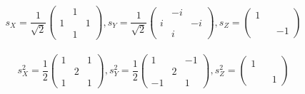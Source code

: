    \begin{displaymath}
     s_X=\frac{1}{\sqrt{2}}
     \left( \begin{array}{rrr}
       &1&\\
       1&&1\\
       &1&
     \end{array} \right), 
     s_Y=\frac{1}{\sqrt{2}}
     \left( \begin{array}{rrr}
       &-i&\\
       i&&-i\\
       &i&
     \end{array} \right), 
     s_Z=
     \left( \begin{array}{rrr}
       1&&\\
       &&\\
       &&-1
     \end{array} \right)
   \end{displaymath}
     \\
   \begin{displaymath}
     s_X^2=\frac{1}{2}
     \left( \begin{array}{rrr}
       1&&1\\
       &2&\\
       1&&1
     \end{array} \right), 
     s_Y^2=\frac{1}{2}
     \left( \begin{array}{rrr}
       1&&-1\\
       &2&\\
       -1&&1
     \end{array} \right), 
     s_Z^2=
     \left( \begin{array}{rrr}
       1&&\\
       &&\\
       &&1
     \end{array} \right)
   \end{displaymath}
 
 

